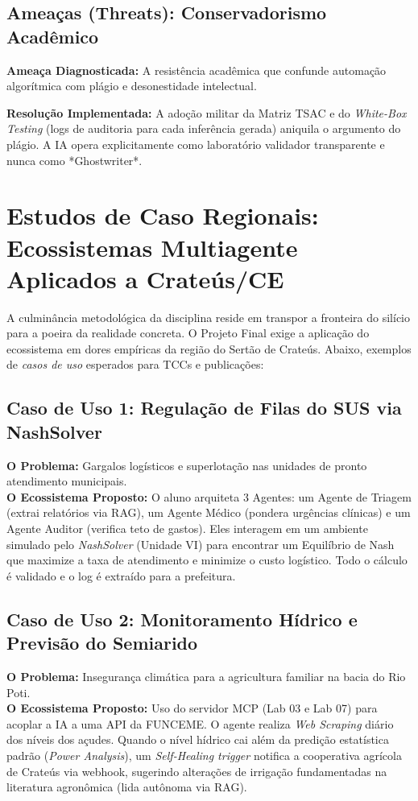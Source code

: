 \documentclass[12pt,a4paper]{article}
\begin{document}
\subsection{Ameaças (Threats): Conservadorismo Acadêmico}
\textbf{Ameaça Diagnosticada:} A resistência acadêmica que confunde automação algorítmica com plágio e desonestidade intelectual. 

\textbf{Resolução Implementada:} A adoção militar da Matriz TSAC e do \textit{White-Box Testing} (logs de auditoria para cada inferência gerada) aniquila o argumento do plágio. A IA opera explicitamente como laboratório validador transparente e nunca como *Ghostwriter*.

\newpage
\section{Estudos de Caso Regionais: Ecossistemas Multiagente Aplicados a Crateús/CE}

A culminância metodológica da disciplina reside em transpor a fronteira do silício para a poeira da realidade concreta. O Projeto Final exige a aplicação do ecossistema em dores empíricas da região do Sertão de Crateús. Abaixo, exemplos de \textit{casos de uso} esperados para TCCs e publicações:

\subsection{Caso de Uso 1: Regulação de Filas do SUS via NashSolver}
\textbf{O Problema:} Gargalos logísticos e superlotação nas unidades de pronto atendimento municipais. \\
\textbf{O Ecossistema Proposto:} O aluno arquiteta 3 Agentes: um Agente de Triagem (extrai relatórios via RAG), um Agente Médico (pondera urgências clínicas) e um Agente Auditor (verifica teto de gastos). Eles interagem em um ambiente simulado pelo \textit{NashSolver} (Unidade VI) para encontrar um Equilíbrio de Nash que maximize a taxa de atendimento e minimize o custo logístico. Todo o cálculo é validado e o log é extraído para a prefeitura.

\subsection{Caso de Uso 2: Monitoramento Hídrico e Previsão do Semiarido}
\textbf{O Problema:} Insegurança climática para a agricultura familiar na bacia do Rio Poti. \\
\textbf{O Ecossistema Proposto:} Uso do servidor MCP (Lab 03 e Lab 07) para acoplar a IA a uma API da FUNCEME. O agente realiza \textit{Web Scraping} diário dos níveis dos açudes. Quando o nível hídrico cai além da predição estatística padrão (\textit{Power Analysis}), um \textit{Self-Healing trigger} notifica a cooperativa agrícola de Crateús via webhook, sugerindo alterações de irrigação fundamentadas na literatura agronômica (lida autônoma via RAG).
\end{document}
